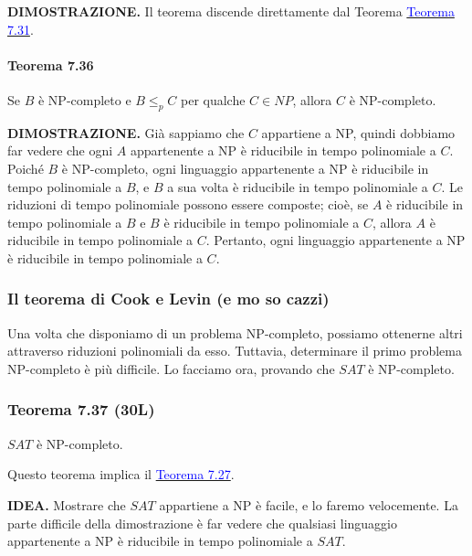 \documentclass{article}
\begin{document}
\text{}
\newline
\textbf{DIMOSTRAZIONE.}
Il teorema discende direttamente dal Teorema \hyperref[teorema-7.31]{\textcolor{blue}{Teorema 7.31}}.

\paragraph{Teorema 7.36}
\label{teorema-7.36}
\vspace{1em}
\text{}
\newline
Se $B$ è NP-completo e $B \leq_p C$ per qualche $C \in NP$, allora $C$ è NP-completo.

\text{}
\newline
\textbf{DIMOSTRAZIONE.}
Già sappiamo che $C$ appartiene a NP, quindi dobbiamo far vedere che ogni $A$ appartenente a NP è riducibile in tempo polinomiale a $C$. 
Poiché $B$ è NP-completo, ogni linguaggio appartenente a NP è riducibile in tempo polinomiale a $B$, e $B$ a sua volta è riducibile in tempo polinomiale a $C$. 
Le riduzioni di tempo polinomiale possono essere composte; cioè, se $A$ è riducibile in tempo polinomiale a $B$ e $B$ è riducibile in tempo polinomiale a $C$, allora $A$ è riducibile in tempo polinomiale a $C$. 
Pertanto, ogni linguaggio appartenente a NP è riducibile in tempo polinomiale a $C$.

\subsubsection{Il teorema di Cook e Levin (e mo so cazzi)}
Una volta che disponiamo di un problema NP-completo, possiamo ottenerne altri attraverso riduzioni polinomiali da esso. 
Tuttavia, determinare il primo problema NP-completo è più difficile.
Lo facciamo ora, provando che $SAT$ è NP-completo.

\subsubsection*{Teorema 7.37 (30L)}
\label{teorema-7.37}
$SAT$ è NP-completo.

\text{}
\newline
Questo teorema implica il \hyperref[teorema-7.27]{\textcolor{blue}{Teorema 7.27}}.

\text{}
\newline
\textbf{IDEA.}
Mostrare che $SAT$ appartiene a NP è facile, e lo faremo velocemente. 
La parte difficile della dimostrazione è far vedere che qualsiasi linguaggio appartenente a NP è riducibile in tempo polinomiale a $SAT$.
\end{document}
